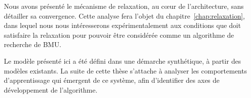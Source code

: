 \documentclass[../main]{subfiles}
\begin{document}
Nous avons présenté le mécanisme de relaxation, au c\oe{}ur de l'architecture, sans détailler sa convergence. Cette analyse fera l'objet du chapitre~\ref{chap:relaxation}, dans lequel nous nous intéresserons expérimentalement aux conditions que doit satisfaire la relaxation pour pouvoir être considérée comme un algorithme de recherche de BMU.

Le modèle présenté ici a été défini dans une démarche synthétique, à partir des modèles existants.
La suite de cette thèse s'attache à analyser les comportements d'apprentissage qui émergent de ce système, afin d'identifier des axes de développement de l'algorithme.


\ifSubfilesClassLoaded{
    \printbibliography
}{}
\end{document}
